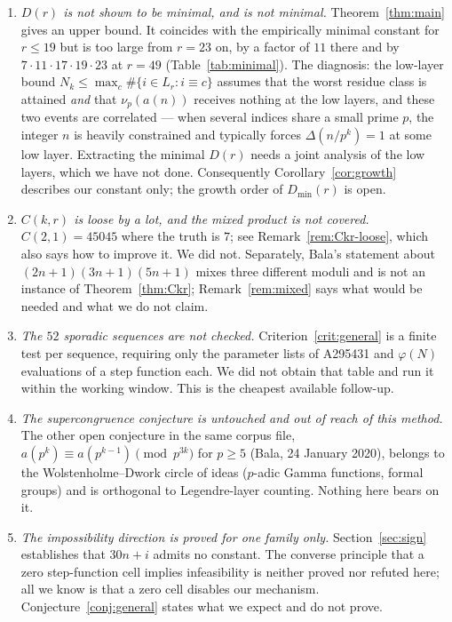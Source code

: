 \documentclass[11pt]{article}
\theoremstyle{plain}
\theoremstyle{definition}
\theoremstyle{remark}
\numberwithin{equation}{section}
\newcommand{\Lr}{L_r}
\begin{document}
\begin{enumerate}

\item \emph{$D(r)$ is not shown to be minimal, and is not minimal.} Theorem~\ref{thm:main} gives
an upper bound. It coincides with the empirically minimal constant for $r \le 19$ but is too
large from $r=23$ on, by a factor of $11$ there and by $7\cdot11\cdot17\cdot19\cdot23$ at $r=49$
(Table~\ref{tab:minimal}). The diagnosis: the low-layer bound $N_k \le \max_c\#\{i \in \Lr :
i \equiv c\}$ assumes that the worst residue class is attained \emph{and} that $\nu_p(a(n))$
receives nothing at the low layers, and these two events are correlated --- when several indices
share a small prime $p$, the integer $n$ is heavily constrained and typically forces
$\Delta(n/p^k)=1$ at some low layer. Extracting the minimal $D(r)$ needs a joint analysis of the
low layers, which we have not done. Consequently Corollary~\ref{cor:growth} describes our
constant only; the growth order of $D_{\min}(r)$ is open.

\item \emph{$C(k,r)$ is loose by a lot, and the mixed product is not covered.} $C(2,1) = 45045$
where the truth is $7$; see Remark~\ref{rem:Ckr-loose}, which also says how to improve it. We did
not. Separately, Bala's statement about $(2n+1)(3n+1)(5n+1)$ mixes three different moduli and is
not an instance of Theorem~\ref{thm:Ckr}; Remark~\ref{rem:mixed} says what would be needed and
what we do not claim.

\item \emph{The $52$ sporadic sequences are not checked.} Criterion~\ref{crit:general} is a
finite test per sequence, requiring only the parameter lists of A295431 and $\varphi(N)$
evaluations of a step function each. We did not obtain that table and run it within the working
window. This is the cheapest available follow-up.

\item \emph{The supercongruence conjecture is untouched and out of reach of this method.} The
other open conjecture in the same corpus file, $a(p^k) \equiv a(p^{k-1}) \pmod{p^{3k}}$ for
$p \ge 5$ (Bala, 24 January 2020), belongs to the Wolstenholme--Dwork circle of ideas ($p$-adic
Gamma functions, formal groups) and is orthogonal to Legendre-layer counting. Nothing here bears
on it.

\item \emph{The impossibility direction is proved for one family only.} Section~\ref{sec:sign}
establishes that $30n+i$ admits no constant. The converse principle that a zero step-function
cell implies infeasibility is neither proved nor refuted here; all we know is that a zero cell
disables our mechanism. Conjecture~\ref{conj:general} states what we expect and do not prove.


\end{enumerate}
\end{document}
